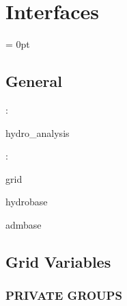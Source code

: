 
\section{Interfaces} 


\parskip = 0pt

\vspace{3mm} \subsection*{General}

: 

hydro\_analysis
\vspace{2mm}

: 

grid

hydrobase

admbase
\vspace{2mm}
\subsection*{Grid Variables}
\vspace{5mm}\subsubsection{PRIVATE GROUPS}

\vspace{5mm}

